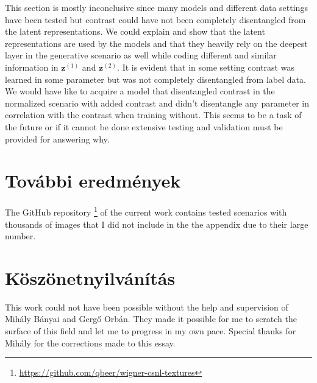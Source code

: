 \documentclass[12pt, english]{article}
\begin{document}
\vspace{4mm}

\par This section is mostly inconclusive since many models and different data settings have been tested but contrast could have not been completely disentangled from the latent representations. We could explain and show that the latent representations are used by the models and that they heavily rely on the deepest layer in the generative scenario as well while coding different and similar information in $\bm{z}^{(1)}$ and $\bm{z}^{(2)}$. It is evident that in some setting contrast was learned in some parameter but was not completely disentangled from label data. We would have like to acquire a model that disentangled contrast in the normalized scenario with added contrast and didn't disentangle any parameter in correlation with the contrast when training without. This seems to be a task of the future or if it cannot be done extensive testing and validation must be provided for answering why.

\vspace{7mm}

\section{További eredmények}

\vspace{7mm}

\par The GitHub repository \footnote{\url{https://github.com/qbeer/wigner-csnl-textures}} of the current work contains tested scenarios with thousands of images that I did not include in the the appendix due to their large number. 

\vspace{7mm}

\section{Köszönetnyilvánítás}

\vspace{7mm}

\par This work could not have been possible without the help and supervision of Mihály Bányai and Gergő Orbán. They made it possible for me to scratch the surface of this field and let me to progress in my own pace. Special thanks for Mihály for the corrections made to this essay.

\newpage
\end{document}
